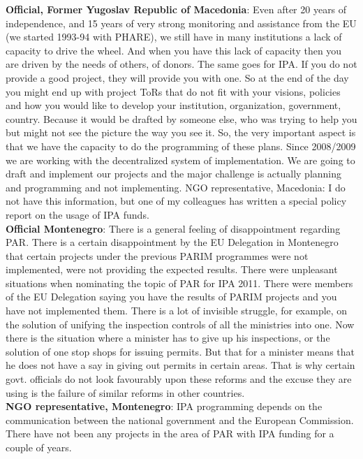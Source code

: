 \textbf{Official, Former Yugoslav Republic of Macedonia}: Even after 20 years of independence, and 15 years of very strong monitoring and assistance from the EU (we started 1993-94 with PHARE), we still have in many institutions a lack of capacity to drive the wheel. And when you have this lack of capacity then you are driven by the needs of others, of donors. The same goes for IPA. If you do not provide a good project, they will provide you with one. So at the end of the day you might end up with project ToRs that do not fit with your visions, policies and how you would like to develop your institution, organization, government, country. Because it would be drafted by someone else, who was trying to help you but might not see the picture the way you see it. So, the very important aspect is that we have the capacity to do the programming of these plans. Since 2008/2009 we are working with the decentralized system of implementation. We are going to draft and implement our projects and the major challenge is actually planning and programming and not implementing.
NGO representative, Macedonia: I do not have this information, but one of my colleagues has written a special policy report on the usage of IPA funds.  \\
\textbf{Official Montenegro}: There is a general feeling of disappointment regarding  PAR. There is a certain disappointment by the EU Delegation in Montenegro that certain projects under the previous PARIM programmes were not implemented, were not providing the expected results. There were unpleasant situations when nominating the topic of PAR for IPA 2011. There were members of the EU Delegation saying you have the results of PARIM projects and you have not implemented them. There is a lot of invisible struggle, for example, on the solution of unifying the inspection controls of all the ministries into one. Now there is the situation where a minister has to give up his inspections, or the solution of one stop shops for issuing permits. But that for a minister means that he does not have a say in giving out permits in certain areas. That is why certain govt. officials do not look favourably upon these reforms and the excuse they are using is the failure of similar reforms in other countries.\\
\textbf{NGO representative, Montenegro}: IPA programming depends on the communication between the national government and the European Commission. There have not been any projects in the area of PAR with IPA funding for a couple of years.%

